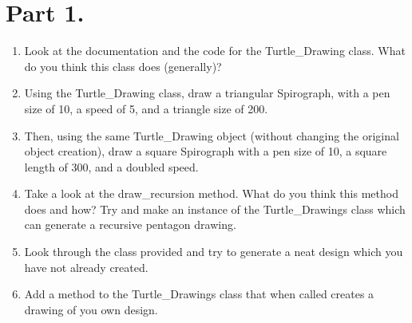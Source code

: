 \documentclass[11pt, letterpaper, onecolumn, oneside, final]{article}
\begin{document}
\section{Part 1.}
\begin{enumerate}

    \item Look at the documentation and the code for the {\consolas Turtle\_Drawing} class. What do you think this class does (generally)?
    
    \item Using the {\consolas Turtle\_Drawing} class, draw a triangular Spirograph, with a pen size of 10,  a speed of 5, and a triangle size of 200.
    
    \item Then, using the same {\consolas Turtle\_Drawing} object (without changing the original object creation), draw a square Spirograph with a pen size of 10, a square length of 300, and a doubled speed.
    
    \item Take a look at the {\consolas draw\_recursion} method. What do you think this method does and how? Try and make an instance of the {\consolas Turtle\_Drawings} class which can generate a recursive pentagon drawing.
    
    \item Look through the class provided and try to generate a neat design which you have not already created.
    
    \item Add a method to the {\consolas Turtle\_Drawings} class that when called creates a drawing of you own design.
\end{enumerate}
    
    
\end{document}
